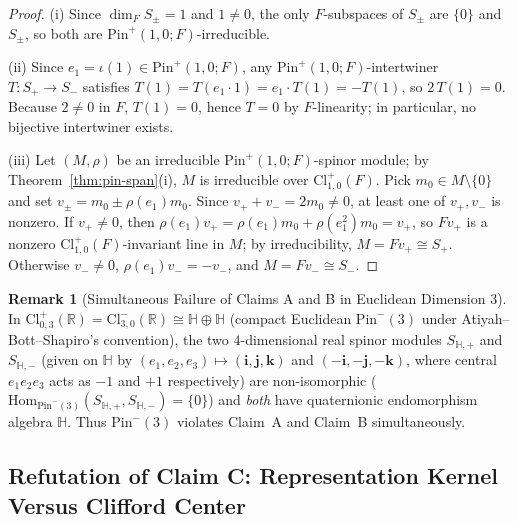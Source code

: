 \documentclass[11pt,a4paper]{article}
\theoremstyle{plain}
\theoremstyle{definition}
\newtheorem{remark}[theorem]{Remark}
\newcommand{\Cl}{\mathrm{Cl}}
\newcommand{\Pin}{\mathrm{Pin}}
\newcommand{\Hom}{\mathrm{Hom}}
\newcommand{\R}{\mathbb{R}}
\newcommand{\HH}{\mathbb{H}}
\begin{document}
\begin{proof}
(i) Since $\dim_F S_\pm = 1$ and $1 \neq 0$, the only $F$-subspaces of $S_\pm$ are $\{0\}$ and $S_\pm$, so both are $\Pin^+(1,0;F)$-irreducible.

(ii) Since $e_1 = \iota(1) \in \Pin^+(1,0;F)$, any $\Pin^+(1,0;F)$-intertwiner $T : S_+ \to S_-$ satisfies $T(1) = T(e_1 \cdot 1) = e_1 \cdot T(1) = -T(1)$, so $2\,T(1) = 0$. Because $2 \neq 0$ in $F$, $T(1) = 0$, hence $T = 0$ by $F$-linearity; in particular, no bijective intertwiner exists.

(iii) Let $(M, \rho)$ be an irreducible $\Pin^+(1,0;F)$-spinor module; by Theorem~\ref{thm:pin-span}(i), $M$ is irreducible over $\Cl_{1,0}^+(F)$. Pick $m_0 \in M \setminus \{0\}$ and set $v_\pm = m_0 \pm \rho(e_1)m_0$. Since $v_+ + v_- = 2 m_0 \neq 0$, at least one of $v_+, v_-$ is nonzero. If $v_+ \neq 0$, then $\rho(e_1)v_+ = \rho(e_1)m_0 + \rho(e_1^2)m_0 = v_+$, so $F v_+$ is a nonzero $\Cl_{1,0}^+(F)$-invariant line in $M$; by irreducibility, $M = F v_+ \cong S_+$. Otherwise $v_- \neq 0$, $\rho(e_1)v_- = -v_-$, and $M = F v_- \cong S_-$.
\end{proof}

\begin{remark}[Simultaneous Failure of Claims A and B in Euclidean Dimension 3]
In $\Cl_{0,3}^+(\R) = \Cl_{3,0}^-(\R) \cong \HH \oplus \HH$ (compact Euclidean $\Pin^-(3)$ under Atiyah--Bott--Shapiro's convention), the two $4$-dimensional real spinor modules $S_{\HH,+}$ and $S_{\HH,-}$ (given on $\HH$ by $(e_1,e_2,e_3) \mapsto (\mathbf{i},\mathbf{j},\mathbf{k})$ and $(-\mathbf{i},-\mathbf{j},-\mathbf{k})$, where central $e_1 e_2 e_3$ acts as $-1$ and $+1$ respectively) are non-isomorphic ($\Hom_{\Pin^-(3)}(S_{\HH,+}, S_{\HH,-}) = \{0\}$) and \emph{both} have quaternionic endomorphism algebra $\HH$. Thus $\Pin^-(3)$ violates Claim~A and Claim~B simultaneously.
\end{remark}

\subsection{Refutation of Claim C: Representation Kernel Versus Clifford Center}
\end{document}
